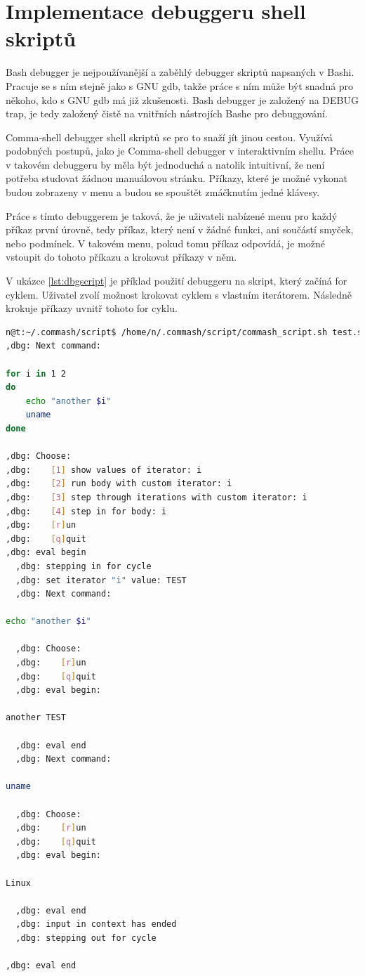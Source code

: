 \documentclass[thesis=M,czech]{FITthesis}[2012/06/26]
\begin{document}
\section{Implementace debuggeru shell skriptů}

Bash debugger je nejpoužívanější a zaběhlý debugger skriptů napsaných v Bashi. Pracuje se s ním stejně jako s GNU gdb, takže práce s ním může být snadná pro někoho, kdo s GNU gdb má již zkušenosti. Bash debugger je založený na DEBUG trap, je tedy založený čistě na vnitřních nástrojích Bashe pro debuggování.

Comma-shell debugger shell skriptů se pro to snaží jít jinou cestou. Využívá podobných postupů, jako je Comma-shell debugger v interaktivním shellu. Práce v takovém debuggeru by měla být jednoduchá a natolik intuitivní, že není potřeba studovat žádnou manuálovou stránku. Příkazy, které je možné vykonat budou zobrazeny v menu a budou se spouštět zmáčknutím jedné klávesy.

Práce s tímto debuggerem je taková, že je uživateli nabízené menu pro každý příkaz první úrovně, tedy příkaz, který není v žádné funkci, ani součástí smyček, nebo podmínek. V takovém menu, pokud tomu příkaz odpovídá, je možné vstoupit do tohoto příkazu a krokovat příkazy v něm.

V ukázce \ref{lst:dbgscript} je příklad použití debuggeru na skript, který začíná for cyklem. Uživatel zvolí možnost krokovat cyklem s vlastním iterátorem. Následně krokuje příkazy uvnitř tohoto for cyklu.

\begin{minipage}{\linewidth}
\begin{lstlisting}[language=bash, caption={Debugger shell skriptu}, label={lst:dbgscript}]
n@t:~/.commash/script$ /home/n/.commash/script/commash_script.sh test.sh 
,dbg: Next command:

for i in 1 2
do
	echo "another $i"
	uname
done

,dbg: Choose:
,dbg:    [1] show values of iterator: i
,dbg:    [2] run body with custom iterator: i
,dbg:    [3] step through iterations with custom iterator: i
,dbg:    [4] step in for body: i
,dbg:    [r]un
,dbg:    [q]quit	
,dbg: eval begin
  ,dbg: stepping in for cycle
  ,dbg: set iterator "i" value: TEST
  ,dbg: Next command:

echo "another $i"

  ,dbg: Choose:
  ,dbg:    [r]un
  ,dbg:    [q]quit	
  ,dbg: eval begin:

another TEST

  ,dbg: eval end
  ,dbg: Next command:

uname

  ,dbg: Choose:
  ,dbg:    [r]un
  ,dbg:    [q]quit	
  ,dbg: eval begin:

Linux

  ,dbg: eval end
  ,dbg: input in context has ended
  ,dbg: stepping out for cycle

,dbg: eval end
\end{lstlisting}
\end{minipage}
\end{document}
